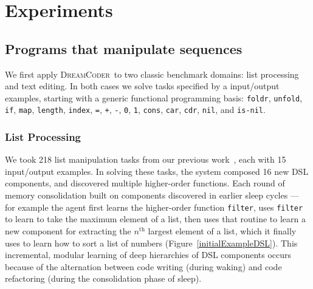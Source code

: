 \documentclass{article}
\newcommand{\system}{\textsc{DreamCoder}~}
\newcommand{\code}[1]{{\footnotesize\texttt{#1}}}
\begin{document}
\section{Experiments}

\subsection{Programs that manipulate sequences}\label{sequences}
We first apply \system to two classic benchmark domains: list
processing and text editing. In both cases we solve tasks specified by
a input/output examples, starting with a generic functional programming
basis: \code{foldr}, \code{unfold}, \code{if}, \code{map},
\code{length}, \code{index}, \code{=}, \code{+}, \code{-}, \code{0},
\code{1}, \code{cons}, \code{car}, \code{cdr}, \code{nil}, and
\code{is-nil}.

\subsubsection{List Processing}\label{listSection}
We took 218 list manipulation tasks from our previous work~\cite{ecc},
each with 15 input/output examples.  In solving these tasks, the
system composed 16 new DSL components, and discovered multiple
higher-order functions. Each round of memory consolidation built on
components discovered in earlier sleep cycles --- for example the
agent first learns the higher-order function \code{filter}, uses
\code{filter} to learn to take the maximum element of a list, then
uses that routine to learn a new component for extracting the
$n^{\text{th}}$ largest element of a list, which it finally uses to
learn how to sort a list of numbers (Figure~\ref{initialExampleDSL}).
This incremental, modular learning of deep hierarchies of DSL
components occurs because of the alternation between code writing
(during waking) and code refactoring (during the consolidation phase
of sleep).

\end{document}
